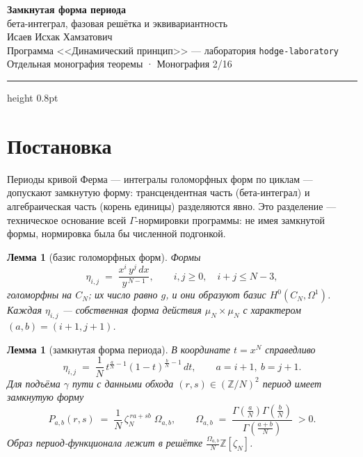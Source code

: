 \documentclass[11pt,a4paper]{article}
\theoremstyle{plain}
\newtheorem{lemma}[theorem]{Лемма}
\theoremstyle{definition}
\theoremstyle{remark}
\newcommand{\ZZ}{\mathbb{Z}}
\newcommand{\Ga}{\Gamma}
\begin{document}
\begin{center}
{\LARGE\bfseries Замкнутая форма периода}\\[0.4em]
{\large бета-интеграл, фазовая решётка и эквивариантность}\\[0.6em]
{\normalsize Исаев Исхак Хамзатович}\\[0.2em]
{\small Программа <<Динамический принцип>> --- лаборатория \texttt{hodge-laboratory}}\\[0.15em]
{\small Отдельная монография теоремы · Монография 2/16}
\end{center}
\vspace{0.4em}
{\color{linkblue}\hrule height 0.8pt}
\vspace{0.8em}

\section{Постановка}

Периоды кривой Ферма --- интегралы голоморфных форм по циклам ---
допускают замкнутую форму: трансцендентная часть (бета-интеграл) и
алгебраическая часть (корень единицы) разделяются явно. Это
разделение --- техническое основание всей $\Ga$-нормировки
программы: не имея замкнутой формы, нормировка была бы численной
подгонкой.

\begin{lemma}[базис голоморфных форм]\label{lem:forms}
Формы
\[
  \eta_{i,j} \;=\; \frac{x^i\,y^j\,dx}{y^{\,N-1}},
  \qquad i,j\ge 0,\quad i+j\le N-3,
\]
голоморфны на $C_N$; их число равно $g$, и они образуют базис
$H^0(C_N,\Omega^1)$. Каждая $\eta_{i,j}$ --- собственная форма
действия $\mu_N\times\mu_N$ с характером $(a,b)=(i+1,j+1)$.
\end{lemma}

\begin{lemma}[замкнутая форма периода]\label{lem:closedform}
В координате $t=x^N$ справедливо
\[
  \eta_{i,j} \;=\; \frac{1}{N}\,
  t^{\frac{a}{N}-1}(1-t)^{\frac{b}{N}-1}\,dt,
  \qquad a=i+1,\ b=j+1.
\]
Для подъёма $\gamma$ пути с данными обхода $(r,s)\in(\ZZ/N)^2$
период имеет замкнутую форму
\[
  P_{a,b}(r,s) \;=\; \frac{1}{N}\,\zeta_N^{\,ra+sb}\;\Omega_{a,b},
  \qquad
  \Omega_{a,b}\;=\;\frac{\Ga(\frac aN)\Ga(\frac bN)}{\Ga(\frac{a+b}N)}
  \;>0.
\]
Образ период-функционала лежит в решётке
$\frac{\Omega_{a,b}}{N}\ZZ[\zeta_N]$.
\end{lemma}
\end{document}
